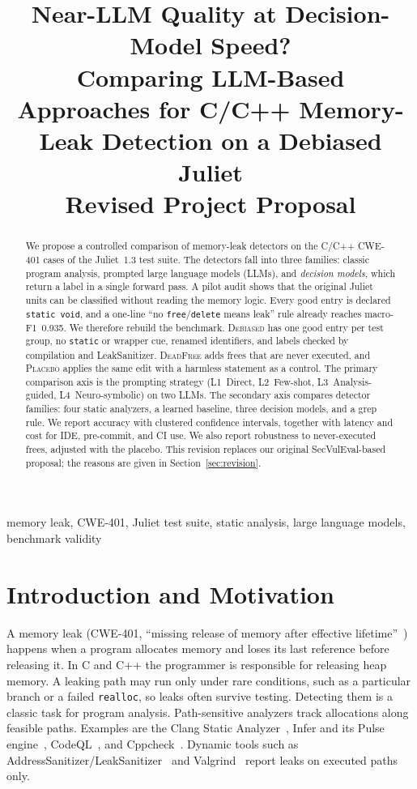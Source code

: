 \documentclass[conference]{IEEEtran}
\title{Near-LLM Quality at Decision-Model Speed?\\
Comparing LLM-Based Approaches for C/C++ Memory-Leak Detection on a Debiased Juliet\\[0.3em]
\large Revised Project Proposal}
\author{
\IEEEauthorblockN{Yu Zhang}
\IEEEauthorblockA{ShanghaiTech University\\
Shanghai, China\\
\href{mailto:Zhangyu12026@shanghaitech.edu.cn}{Zhangyu12026@shanghaitech.edu.cn}}
\and
\IEEEauthorblockN{MingDong Wu}
\IEEEauthorblockA{ShanghaiTech University\\
Shanghai, China\\
\href{mailto:wumd2024@shanghaitech.edu.cn}{wumd2024@shanghaitech.edu.cn}}
\linebreakand
\IEEEauthorblockN{Zhixiong Zhang}
\IEEEauthorblockA{ShanghaiTech University\\
Shanghai, China\\
\href{mailto:zhangzhx2026@shanghaitech.edu.cn}{zhangzhx2026@shanghaitech.edu.cn}}
\and
\IEEEauthorblockN{Zhihao Tang}
\IEEEauthorblockA{ShanghaiTech University\\
Shanghai, China\\
\href{mailto:tangzhh2026@shanghaitech.edu.cn}{tangzhh2026@shanghaitech.edu.cn}}
}
\newcommand{\Deb}{\textsc{Debiased}}
\newcommand{\Dead}{\textsc{DeadFree}}
\newcommand{\Plac}{\textsc{Placebo}}
\newcommand{\code}[1]{\texttt{#1}}
\newcommand{\cwe}{CWE-401}
\begin{document}
\maketitle

\begin{abstract}
We propose a controlled comparison of memory-leak detectors on the C/C++ \cwe{} cases of the Juliet~1.3 test suite.
The detectors fall into three families: classic program analysis, prompted large language models (LLMs), and \emph{decision models}, which return a label in a single forward pass.
A pilot audit shows that the original Juliet units can be classified without reading the memory logic.
Every good entry is declared \code{static void}, and a one-line ``no \code{free}/\code{delete} means leak'' rule already reaches macro-F1~0.935. %
We therefore rebuild the benchmark.
\Deb{} has one good entry per test group, no \code{static} or wrapper cue, renamed identifiers, and labels checked by compilation and LeakSanitizer.
\Dead{} adds frees that are never executed, and \Plac{} applies the same edit with a harmless statement as a control.
The primary comparison axis is the prompting strategy (L1~Direct, L2~Few-shot, L3~Analysis-guided, L4~Neuro-symbolic) on two LLMs.
The secondary axis compares detector families: four static analyzers, a learned baseline, three decision models, and a grep rule.
We report accuracy with clustered confidence intervals, together with latency and cost for IDE, pre-commit, and CI use.
We also report robustness to never-executed frees, adjusted with the placebo.
This revision replaces our original SecVulEval-based proposal; the reasons are given in Section~\ref{sec:revision}.
\end{abstract}

\begin{IEEEkeywords}
memory leak, CWE-401, Juliet test suite, static analysis, large language models, benchmark validity
\end{IEEEkeywords}

\section{Introduction and Motivation}
\label{sec:intro}
A memory leak (\cwe{}, ``missing release of memory after effective lifetime''~\cite{mitrecwe401}) happens when a program allocates memory and loses its last reference before releasing it.
In C and C++ the programmer is responsible for releasing heap memory.
A leaking path may run only under rare conditions, such as a particular branch or a failed \code{realloc}, so leaks often survive testing.
Detecting them is a classic task for program analysis.
Path-sensitive analyzers track allocations along feasible paths.
Examples are the Clang Static Analyzer~\cite{clangsa}, Infer and its Pulse engine~\cite{calcagno2015infer,le2022pulse}, CodeQL~\cite{codeqldocs}, and Cppcheck~\cite{cppcheck}.
Dynamic tools such as AddressSanitizer/LeakSanitizer~\cite{serebryany2012asan,lsan} and Valgrind~\cite{nethercote2007valgrind} report leaks on executed paths only.
\end{document}

